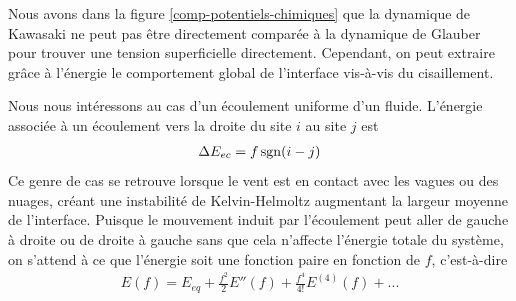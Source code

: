 Nous avons dans la figure \ref{comp-potentiels-chimiques} que la dynamique de Kawasaki ne peut pas être directement comparée à la dynamique de Glauber pour trouver une tension superficielle directement. Cependant, on peut extraire grâce à l'énergie le comportement global de l'interface vis-à-vis du cisaillement.


Nous nous intéressons au cas d'un écoulement uniforme d'un fluide. L'énergie associée à un écoulement vers la droite du site $i$ au site $j$ est
\begin{align}
    \Delta E_{ec} = f \operatorname{sgn}(i-j)
    \label{ecoulement-uniforme}
\end{align}
Ce genre de cas se retrouve lorsque le vent est en contact avec les vagues ou des nuages, créant une instabilité de Kelvin-Helmoltz augmentant la largeur moyenne de l'interface. Puisque le mouvement induit par l'écoulement peut aller de gauche à droite ou de droite à gauche sans que cela n'affecte l'énergie totale du système, on s'attend à ce que l'énergie soit une fonction paire en fonction de $f$, c'est-à-dire 
\begin{align}
    E(f) = E_{eq} + \frac{f^2}{2} E''(f) + \frac{f^4}{4!} E^{(4)}(f) + ...
\end{align}

